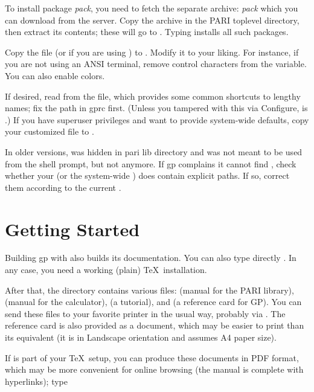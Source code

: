 \medskip

To install package \emph{pack}, you need to fetch the separate archive:
\emph{pack} which you can download from the  server.
Copy the archive in the PARI toplevel directory, then extract its
contents; these will go to . Typing  installs all such packages.

 Copy the file  (or
 if you are using ) to . Modify
it to your liking. For instance, if you are not using an ANSI terminal,
remove control characters from the  variable. You can also
enable colors.

If desired, read   from the 
file, which provides some common shortcuts to lengthy names; fix the path in
gprc first. (Unless you tampered with this via Configure,  is
.) If you have superuser privileges and want to
provide system-wide defaults, copy your customized  file to
.

In older versions,  was hidden in pari lib directory and was not
meant to be used from the shell prompt, but not anymore. If gp complains it
cannot find , check whether your  (or the system-wide
) does contain explicit paths. If so, correct them according to the
current .

\section{Getting Started}

 Building gp with  also builds
its documentation. You can also type directly . In any case,
you need a working (plain) \TeX\ installation.

After that, the  directory contains various  files:
 (manual for the PARI library),  (manual
for the  calculator),  (a tutorial), and
 (a reference card for GP). You can send these files to your
favorite printer in the usual way, probably via . The reference
card is also provided as a  document, which may be easier to
print than its  equivalent (it is in Landscape orientation and
assumes A4 paper size).

\noindent If  is part of your \TeX\ setup, you can produce these
documents in PDF format, which may be more convenient for online browsing
(the manual is complete with hyperlinks); type

